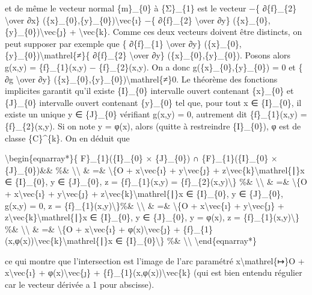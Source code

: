 \documentclass[]{article}
\begin{document}
et de même le vecteur normal \{m\}\_\{0\} à \{Σ\}\_\{1\} est le vecteur
−\{ ∂\{f\}\_\{2\} \textbackslash{}over ∂x\}
(\{x\}\_\{0\},\{y\}\_\{0\})\textbackslash{}vec\{ı\} −\{ ∂\{f\}\_\{2\}
\textbackslash{}over ∂y\}
(\{x\}\_\{0\},\{y\}\_\{0\})\textbackslash{}vec\{ȷ\} +
\textbackslash{}vec\{k\}. Comme ces deux vecteurs doivent être
distincts, on peut supposer par exemple que \{ ∂\{f\}\_\{1\}
\textbackslash{}over ∂y\}
(\{x\}\_\{0\},\{y\}\_\{0\})\textbackslash{}mathrel\{≠\}\{ ∂\{f\}\_\{2\}
\textbackslash{}over ∂y\} (\{x\}\_\{0\},\{y\}\_\{0\}). Posons alors
g(x,y) = \{f\}\_\{1\}(x,y) − \{f\}\_\{2\}(x,y). On a donc
g(\{x\}\_\{0\},\{y\}\_\{0\}) = 0 et \{ ∂g \textbackslash{}over ∂y\}
(\{x\}\_\{0\},\{y\}\_\{0\})\textbackslash{}mathrel\{≠\}0. Le théorème
des fonctions implicites garantit qu'il existe \{I\}\_\{0\} intervalle
ouvert contenant \{x\}\_\{0\} et \{J\}\_\{0\} intervalle ouvert
contenant \{y\}\_\{0\} tel que, pour tout x ∈ \{I\}\_\{0\}, il existe un
unique y ∈ \{J\}\_\{0\} vérifiant g(x,y) = 0, autrement dit
\{f\}\_\{1\}(x,y) = \{f\}\_\{2\}(x,y). Si on note y = φ(x), alors
(quitte à restreindre \{I\}\_\{0\}), φ est de classe \{C\}\^{}\{k\}. On
en déduit que

\textbackslash{}begin\{eqnarray*\}\{ F\}\_\{1\}(\{I\}\_\{0\} ×
\{J\}\_\{0\}) ∩ \{F\}\_\{1\}(\{I\}\_\{0\} × \{J\}\_\{0\})\&\& \%\&
\textbackslash{}\textbackslash{} \& =\& \textbackslash{}\{O +
x\textbackslash{}vec\{ı\} + y\textbackslash{}vec\{ȷ\} +
z\textbackslash{}vec\{k\}\textbackslash{}mathrel\{∣\}x ∈ \{I\}\_\{0\}, y
∈ \{J\}\_\{0\}, z = \{f\}\_\{1\}(x,y) =
\{f\}\_\{2\}(x,y)\textbackslash{}\} \%\&
\textbackslash{}\textbackslash{} \& =\& \textbackslash{}\{O +
x\textbackslash{}vec\{ı\} + y\textbackslash{}vec\{ȷ\} +
z\textbackslash{}vec\{k\}\textbackslash{}mathrel\{∣\}x ∈ \{I\}\_\{0\}, y
∈ \{J\}\_\{0\}, g(x,y) = 0, z = \{f\}\_\{1\}(x,y)\textbackslash{}\}\%\&
\textbackslash{}\textbackslash{} \& =\& \textbackslash{}\{O +
x\textbackslash{}vec\{ı\} + y\textbackslash{}vec\{ȷ\} +
z\textbackslash{}vec\{k\}\textbackslash{}mathrel\{∣\}x ∈ \{I\}\_\{0\}, y
∈ \{J\}\_\{0\}, y = φ(x), z = \{f\}\_\{1\}(x,y)\textbackslash{}\} \%\&
\textbackslash{}\textbackslash{} \& =\& \textbackslash{}\{O +
x\textbackslash{}vec\{ı\} + φ(x)\textbackslash{}vec\{ȷ\} +
\{f\}\_\{1\}(x,φ(x))\textbackslash{}vec\{k\}\textbackslash{}mathrel\{∣\}x
∈ \{I\}\_\{0\}\textbackslash{}\} \%\& \textbackslash{}\textbackslash{}
\textbackslash{}end\{eqnarray*\}

ce qui montre que l'intersection est l'image de l'arc paramétré
x\textbackslash{}mathrel\{↦\}O + x\textbackslash{}vec\{ı\} +
φ(x)\textbackslash{}vec\{ȷ\} +
\{f\}\_\{1\}(x,φ(x))\textbackslash{}vec\{k\} (qui est bien entendu
régulier car le vecteur dérivée a 1 pour abscisse).
\end{document}
